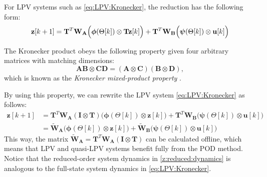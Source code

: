 For LPV systems such as \eqref{eq:LPV:Kronecker}, the reduction has the following form:
\begin{equation}
 \mathbf{z}[k+1] = \mathbf{T}^T\mathbf{W_A}\Bigl(\boldsymbol{\phi}(\Theta[k]) \otimes \mathbf{T}\mathbf{z}[k]\Bigr) 
     + \mathbf{T}^T\mathbf{W_B}\Bigl(\boldsymbol{\psi}(\Theta[k]) \otimes \mathbf{u}[k]\Bigr)   
\end{equation}

The Kronecker product obeys the following property given four arbitrary matrices with matching dimensions:
\begin{equation}
    \mathbf{AB} \otimes \mathbf{CD} = (\mathbf{A} \otimes \mathbf{C})(\mathbf{B} \otimes \mathbf{D}),
\end{equation}
which is known as the \textit{Kronecker mixed-product property} \cite{Zhang2013}.

By using this property, we can rewrite the LPV system \eqref{eq:LPV:Kronecker} as follows:
\begin{equation}
\begin{aligned}
 \mathbf{z}[k+1] &= \mathbf{T}^T\mathbf{W_A}(\mathbf{I} \otimes \mathbf{T})\bigl(\boldsymbol{\phi}(\Theta[k]) \otimes \mathbf{z}[k]\bigr)    + \mathbf{T}^T\mathbf{W_B}\bigl (\boldsymbol{\psi}(\Theta[k]) \otimes \mathbf{u}[k]\bigr)   \\
    &= \widetilde{\mathbf{W}}_{\mathbf{A}}\bigl(\boldsymbol{\phi}(\Theta[k]) \otimes \mathbf{z}[k]\bigr)   +\widetilde{\mathbf{W}}_{\mathbf{B}}\bigl(\boldsymbol{\psi}(\Theta[k]) \otimes \mathbf{u}[k]\bigr) 
 \end{aligned} \label{z:reduced:dynamics}
\end{equation}
This way, the matrix  $\widetilde{\mathbf{W}}_{\mathbf{A}}=\mathbf{T}^T\mathbf{W_A}(\mathbf{I} \otimes \mathbf{T})$ can be calculated offline, which means that LPV and quasi-LPV systems benefit fully from the POD method. Notice that the reduced-order system dynamics in \eqref{z:reduced:dynamics} is analogous to the full-state system dynamics in \eqref{eq:LPV:Kronecker}.

\begin{comment}
\end{comment}


